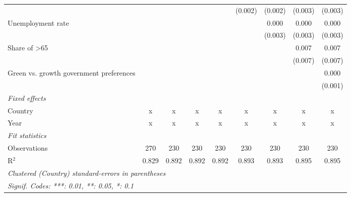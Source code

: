 \begin{table}[htbp]
\begin{tabular}{lcccccccc}
                                                                       &         &               &               &              & (0.002) & (0.002) & (0.003) & (0.003)\\   
      Unemployment rate                                                &         &               &               &              &         & 0.000   & 0.000   & 0.000\\   
                                                                       &         &               &               &              &         & (0.003) & (0.003) & (0.003)\\   
      Share of >65                                                     &         &               &               &              &         &         & 0.007   & 0.007\\   
                                                                       &         &               &               &              &         &         & (0.007) & (0.007)\\   
      Green vs. growth government preferences                          &         &               &               &              &         &         &         & 0.000\\   
                                                                       &         &               &               &              &         &         &         & (0.001)\\   
      \emph{Fixed effects}\\
      Country                                                          & x       & x             & x             & x            & x       & x       & x       & x\\  
      Year                                                             & x       & x             & x             & x            & x       & x       & x       & x\\  
      \midrule \emph{Fit statistics}\\
      Observations                                                     & 270     & 230           & 230           & 230          & 230     & 230     & 230     & 230\\  
      R$^2$                                                            & 0.829   & 0.892         & 0.892         & 0.892        & 0.893   & 0.893   & 0.895   & 0.895\\  
      \midrule
      \multicolumn{9}{l}{\emph{Clustered (Country) standard-errors in parentheses}}\\
      \multicolumn{9}{l}{\emph{Signif. Codes: ***: 0.01, **: 0.05, *: 0.1}}\\
   \end{tabular}
\end{table}


